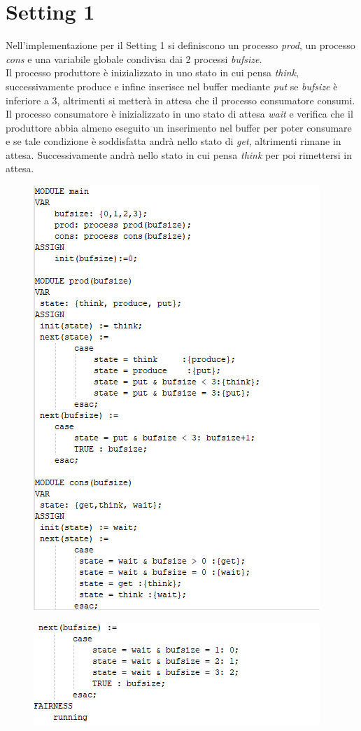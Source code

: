 \documentclass{article}
\begin{document}
\section{Setting 1}
Nell'implementazione per il Setting 1 si definiscono un processo \textit{prod}, un processo \textit{cons} e una variabile globale condivisa dai 2 processi \textit{bufsize}.
\\ Il processo produttore è inizializzato in uno stato in cui pensa \textit{think}, successivamente produce e infine inserisce nel buffer mediante \textit{put} se \textit{bufsize} è inferiore a 3, altrimenti si metterà in attesa che il processo consumatore consumi.
\\ Il processo consumatore è inizializzato in uno stato di attesa \textit{wait} e verifica che il produttore abbia almeno eseguito un inserimento nel buffer per poter consumare e se tale condizione è soddisfatta andrà nello stato di \textit{get}, altrimenti rimane in attesa. Successivamente andrà nello stato in cui pensa \textit{think} per poi rimettersi in attesa. 
\begin{figure}[h] 
\centering
\includegraphics[scale=0.8]{setting11.png}
\end{figure}
\begin{figure}[h] 
\centering
\includegraphics[scale=0.9]{setting12.png}
\end{figure}
\end{document}
